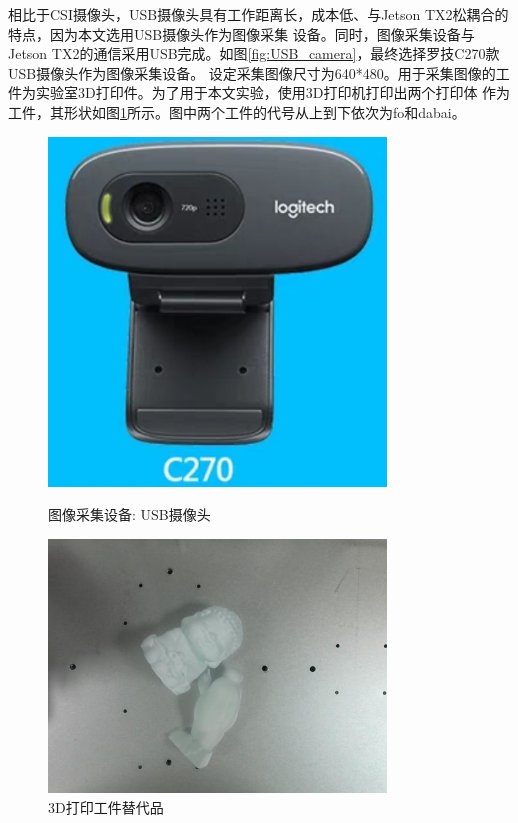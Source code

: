 相比于CSI摄像头，USB摄像头具有工作距离长，成本低、与Jetson TX2松耦合的特点，因为本文选用USB摄像头作为图像采集
设备。同时，图像采集设备与Jetson TX2的通信采用USB完成。如图\ref{fig:USB_camera}，最终选择罗技C270款USB摄像头作为图像采集设备。
设定采集图像尺寸为640*480。用于采集图像的工件为实验室3D打印件。为了用于本文实验，使用3D打印机打印出两个打印体
作为工件，其形状如图\ref{fig:printer}所示。图中两个工件的代号从上到下依次为fo和dabai。

\begin{figure}[h]
    \begin{minipage}[t]{0.45\textwidth}
        \centering
        \includegraphics[width=0.8\textwidth]{pic/chap2/USB_camera.jpg}
        \caption{图像采集设备: USB摄像头}
        \label{fig:USB_camera}
    \end{minipage}
    \begin{minipage}[t]{0.45\textwidth}
        \centering
        \includegraphics[width=0.8\textwidth]{pic/chap2/printer.jpg}
        \caption{3D打印工件替代品}
        \label{fig:printer}
    \end{minipage}
\end{figure}

